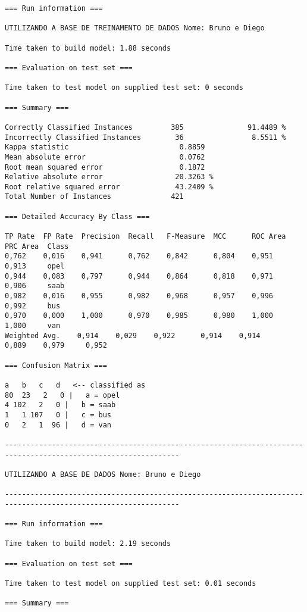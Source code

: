 \documentclass[
	article,			%
	11pt,				%
	oneside,			%
	a4paper,			%
	english,			%
	brazil,				%
	sumario=tradicional
	]{abntex2}
\begin{document}
\begin{lstlisting}
=== Run information ===

UTILIZANDO A BASE DE TREINAMENTO DE DADOS Nome: Bruno e Diego

Time taken to build model: 1.88 seconds

=== Evaluation on test set ===

Time taken to test model on supplied test set: 0 seconds

=== Summary ===

Correctly Classified Instances         385               91.4489 %
Incorrectly Classified Instances        36                8.5511 %
Kappa statistic                          0.8859
Mean absolute error                      0.0762
Root mean squared error                  0.1872
Relative absolute error                 20.3263 %
Root relative squared error             43.2409 %
Total Number of Instances              421     

=== Detailed Accuracy By Class ===

TP Rate  FP Rate  Precision  Recall   F-Measure  MCC      ROC Area  PRC Area  Class
0,762    0,016    0,941      0,762    0,842      0,804    0,951     0,913     opel
0,944    0,083    0,797      0,944    0,864      0,818    0,971     0,906     saab
0,982    0,016    0,955      0,982    0,968      0,957    0,996     0,992     bus
0,970    0,000    1,000      0,970    0,985      0,980    1,000     1,000     van
Weighted Avg.    0,914    0,029    0,922      0,914    0,914      0,889    0,979     0,952     

=== Confusion Matrix ===

a   b   c   d   <-- classified as
80  23   2   0 |   a = opel
4 102   2   0 |   b = saab
1   1 107   0 |   c = bus
0   2   1  96 |   d = van

---------------------------------------------------------------------------------------------------------------

UTILIZANDO A BASE DE DADOS Nome: Bruno e Diego

---------------------------------------------------------------------------------------------------------------

=== Run information ===

Time taken to build model: 2.19 seconds

=== Evaluation on test set ===

Time taken to test model on supplied test set: 0.01 seconds

=== Summary ===


\end{lstlisting}
\end{document}
